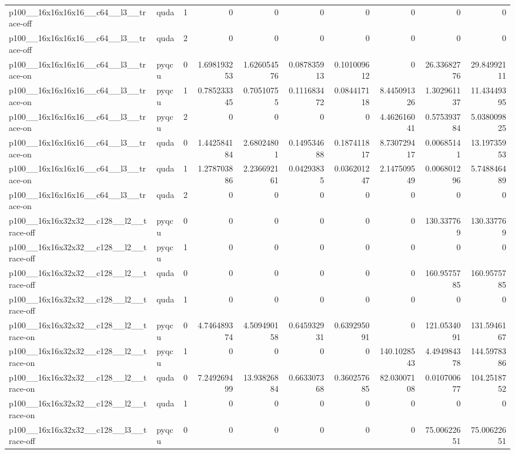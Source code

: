 \begin{table}[htbp]
\begin{tabular}{@{}llrrrrrrrr@{}}
p100\_\_16x16x16x16\_\_c64\_\_l3\_\_trace-off & quda & 1 & 0 & 0 & 0 & 0 & 0 & 0 & 0 \\
p100\_\_16x16x16x16\_\_c64\_\_l3\_\_trace-off & quda & 2 & 0 & 0 & 0 & 0 & 0 & 0 & 0 \\
p100\_\_16x16x16x16\_\_c64\_\_l3\_\_trace-on & pyqcu & 0 & 1.698193253 & 1.626054576 & 0.087835913 & 0.101009612 & 0 & 26.33682776 & 29.84992111 \\
p100\_\_16x16x16x16\_\_c64\_\_l3\_\_trace-on & pyqcu & 1 & 0.785233345 & 0.70510755 & 0.111683472 & 0.084417118 & 8.445091326 & 1.302961137 & 11.43449395 \\
p100\_\_16x16x16x16\_\_c64\_\_l3\_\_trace-on & pyqcu & 2 & 0 & 0 & 0 & 0 & 4.462616041 & 0.575393784 & 5.038009825 \\
p100\_\_16x16x16x16\_\_c64\_\_l3\_\_trace-on & quda & 0 & 1.442584184 & 2.68024801 & 0.149534688 & 0.187411817 & 8.730729417 & 0.00685141 & 13.19735953 \\
p100\_\_16x16x16x16\_\_c64\_\_l3\_\_trace-on & quda & 1 & 1.278703886 & 2.236692161 & 0.04293835 & 0.036201247 & 2.147509549 & 0.006801296 & 5.748846489 \\
p100\_\_16x16x16x16\_\_c64\_\_l3\_\_trace-on & quda & 2 & 0 & 0 & 0 & 0 & 0 & 0 & 0 \\
p100\_\_16x16x32x32\_\_c128\_\_l2\_\_trace-off & pyqcu & 0 & 0 & 0 & 0 & 0 & 0 & 130.337769 & 130.337769 \\
p100\_\_16x16x32x32\_\_c128\_\_l2\_\_trace-off & pyqcu & 1 & 0 & 0 & 0 & 0 & 0 & 0 & 0 \\
p100\_\_16x16x32x32\_\_c128\_\_l2\_\_trace-off & quda & 0 & 0 & 0 & 0 & 0 & 0 & 160.9575785 & 160.9575785 \\
p100\_\_16x16x32x32\_\_c128\_\_l2\_\_trace-off & quda & 1 & 0 & 0 & 0 & 0 & 0 & 0 & 0 \\
p100\_\_16x16x32x32\_\_c128\_\_l2\_\_trace-on & pyqcu & 0 & 4.746489374 & 4.509490158 & 0.645932931 & 0.639295091 & 0 & 121.0534091 & 131.5946167 \\
p100\_\_16x16x32x32\_\_c128\_\_l2\_\_trace-on & pyqcu & 1 & 0 & 0 & 0 & 0 & 140.1028543 & 4.494984378 & 144.5978386 \\
p100\_\_16x16x32x32\_\_c128\_\_l2\_\_trace-on & quda & 0 & 7.249269499 & 13.93826884 & 0.663307368 & 0.360257685 & 82.03007108 & 0.010700677 & 104.2518752 \\
p100\_\_16x16x32x32\_\_c128\_\_l2\_\_trace-on & quda & 1 & 0 & 0 & 0 & 0 & 0 & 0 & 0 \\
p100\_\_16x16x32x32\_\_c128\_\_l3\_\_trace-off & pyqcu & 0 & 0 & 0 & 0 & 0 & 0 & 75.00622651 & 75.00622651 \\

\end{tabular}
\end{table}
